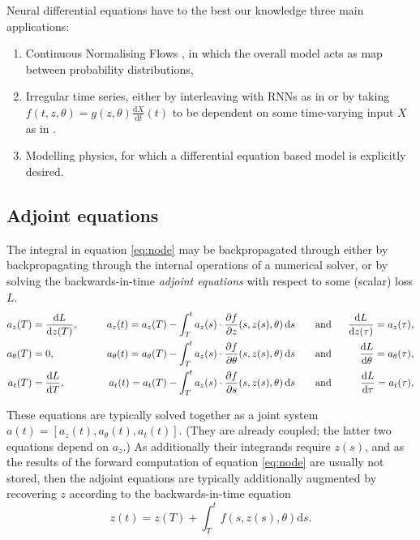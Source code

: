 \documentclass{article}
\theoremstyle{plain}
\theoremstyle{definition}
\newcommand{\dd}{\mathrm{d}}
\begin{document}
Neural differential equations have to the best our knowledge three main applications:
\begin{enumerate}
\item Continuous Normalising Flows \cite{ffjord}, in which the overall model acts as map between probability distributions,
\item Irregular time series, either by interleaving with RNNs as in \citet{latent-odes} or by taking $f(t, z, \theta) = g(z, \theta) \frac{\dd X}{\dd t}(t)$ to be dependent on some time-varying input $X$ as in \citet{kidger2020neuralcde}.
\item Modelling physics, for which a differential equation based model is explicitly desired. \cite{TODO}
\end{enumerate}

\subsection{Adjoint equations}
The integral in equation \eqref{eq:node} may be backpropagated through either by backpropagating through the internal operations of a numerical solver, or by solving the backwards-in-time \emph{adjoint equations} with respect to some (scalar) loss $L$.
\begin{align}
a_z(T) &= \frac{\dd L}{\dd z(T)},\qquad &a_z(t) = a_z(T) - \int_T^t a_z(s) \cdot \frac{\partial f}{\partial z}(s, z(s), \theta) \,\dd s\qquad&\text{and}\hspace{0.6em} &\frac{\dd L}{\dd z(\tau)} = a_z(\tau),\nonumber\\
%
a_\theta(T) &= 0,\qquad &a_\theta(t) = a_\theta(T) - \int_T^t a_z(s) \cdot \frac{\partial f}{\partial \theta}(s, z(s), \theta) \,\dd s\qquad&\text{and}\hspace{0.6em} &\frac{\dd L}{\dd \theta} = a_\theta(\tau),\nonumber\\
%
a_t(T) &= \frac{\dd L}{\dd T},\qquad &a_t(t) = a_t(T) - \int_T^t a_z(s) \cdot \frac{\partial f}{\partial s}(s, z(s), \theta) \,\dd s\qquad&\text{and}\hspace{0.6em} &\frac{\dd L}{\dd \tau} = a_t(\tau),\label{eq:adjoint}
\end{align}

These equations are typically solved together as a joint system $a(t) = [a_z(t), a_\theta(t), a_t(t)]$. (They are already coupled; the latter two equations depend on $a_z$.) As additionally their integrands require $z(s)$, and as the results of the forward computation of equation \eqref{eq:node} are usually not stored, then the adjoint equations are typically additionally augmented by recovering $z$ according to the backwards-in-time equation
\begin{equation}\label{eq:backward}
z(t) = z(T) + \int_T^t f(s, z(s), \theta) \mathrm{d} s.
\end{equation}
\end{document}

